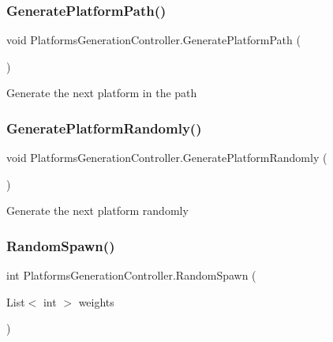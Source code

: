 \subsubsection{\texorpdfstring{Generate\+Platform\+Path()}{GeneratePlatformPath()}}
{\footnotesize\ttfamily void Platforms\+Generation\+Controller.\+Generate\+Platform\+Path (\begin{DoxyParamCaption}{ }\end{DoxyParamCaption})\hspace{0.3cm}{\ttfamily [private]}}

Generate the next platform in the path \mbox{\label{class_platforms_generation_controller_accf9694cf731427ae0d6f89741f9734d}} 
\subsubsection{\texorpdfstring{Generate\+Platform\+Randomly()}{GeneratePlatformRandomly()}}
{\footnotesize\ttfamily void Platforms\+Generation\+Controller.\+Generate\+Platform\+Randomly (\begin{DoxyParamCaption}{ }\end{DoxyParamCaption})\hspace{0.3cm}{\ttfamily [private]}}

Generate the next platform randomly \mbox{\label{class_platforms_generation_controller_a0a5e7c057ba329490925ae1c4d21a06b}} 
\subsubsection{\texorpdfstring{Random\+Spawn()}{RandomSpawn()}}
{\footnotesize\ttfamily int Platforms\+Generation\+Controller.\+Random\+Spawn (\begin{DoxyParamCaption}\item[{List$<$ int $>$}]{weights }\end{DoxyParamCaption})\hspace{0.3cm}{\ttfamily [private]}}

